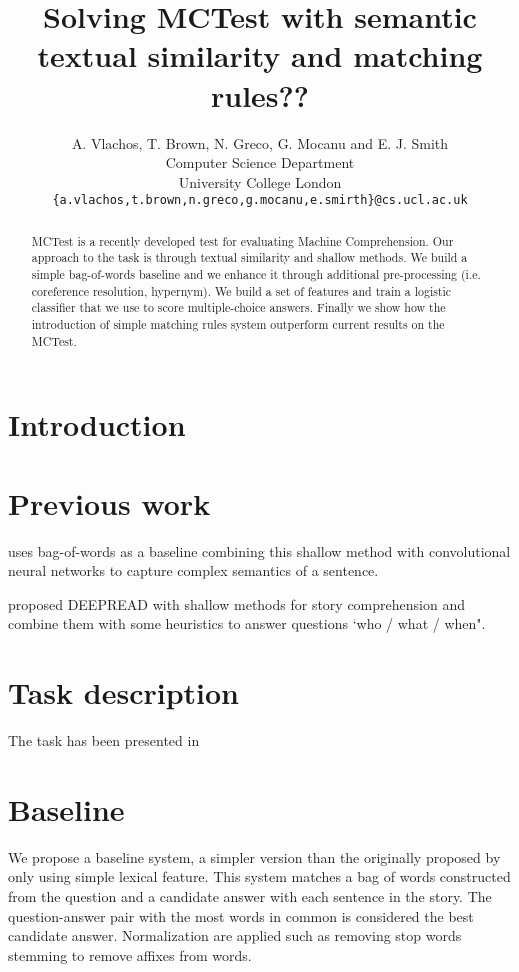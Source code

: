 \documentclass[11pt]{article}
\title{Solving MCTest with semantic textual similarity and matching rules??}
\author
       {A. Vlachos, T. Brown, N. Greco, G. Mocanu and E. J. Smith
       \\
       Computer Science Department\\
	University College London\\
       \tt{\{a.vlachos,t.brown,n.greco,g.mocanu,e.smirth\}@cs.ucl.ac.uk}\\ 
       }
\date{}
\begin{document}
\maketitle
\begin{abstract}
MCTest is a recently developed test for evaluating Machine Comprehension. Our approach to the task is through textual similarity and shallow methods. We build a simple bag-of-words baseline and we enhance it through additional pre-processing (i.e. coreference resolution, hypernym). We build a set of features and train a logistic classifier that we use to score multiple-choice answers. Finally we show how the introduction of simple matching rules system outperform current results on the MCTest.
\end{abstract}

\section{Introduction}

\section{Previous work}

 uses bag-of-words as a baseline combining this shallow method with convolutional neural networks to capture complex semantics of a sentence.

 proposed D{\small EEP}R{\small EAD} with shallow methods for story comprehension and combine them with some heuristics to answer questions `who / what / when".

\section{Task description}

The task has been presented in  \cite{mctest}

\section{Baseline}
We propose a baseline system, a simpler version than the originally proposed by  only using simple lexical feature. This system matches a bag of words constructed from the question and a candidate answer with each sentence in the story. The question-answer pair with the most words in common is considered the best candidate answer. Normalization are applied such as removing stop words stemming to remove affixes from words.
\end{document}
